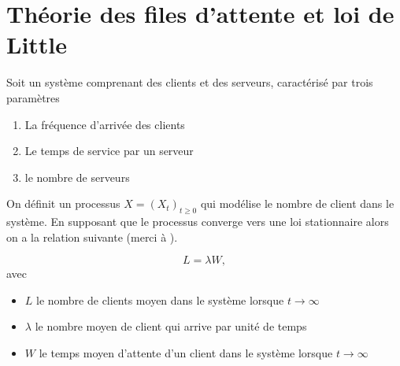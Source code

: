 \section{Théorie des files d'attente et loi de Little}
Soit un système comprenant des clients et des serveurs, caractérisé par trois paramètres
\begin{enumerate}
    \item La fréquence d'arrivée des clients
    \item Le temps de service par un serveur
    \item le nombre de serveurs 
\end{enumerate}
On définit un processus $X = (X_t)_{t\geq 0}$ qui modélise le nombre de client dans le système. En supposant que le processus converge vers une loi stationnaire alors on a la relation suivante (merci à \citet{Little1961}).
\begin{theo}
$$L = \lambda W,$$
avec 
\begin{itemize}
    \item $L$ le nombre de clients moyen dans le système lorsque $t\rightarrow \infty$
    \item $\lambda$ le nombre moyen de client qui arrive par unité de temps
    \item $W$ le temps moyen d'attente d'un client dans le système lorsque $t\rightarrow \infty$
\end{itemize}
\end{theo}
